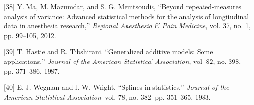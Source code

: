 \documentclass[
]{article}
\begin{document}
\leavevmode\hypertarget{ref-ma2012}{}%
{[}38{]} Y. Ma, M. Mazumdar, and S. G. Memtsoudis, ``Beyond
repeated-measures analysis of variance: Advanced statistical methods for
the analysis of longitudinal data in anesthesia research,''
\emph{Regional Anesthesia \& Pain Medicine}, vol. 37, no. 1, pp.
99--105, 2012.

\leavevmode\hypertarget{ref-hastie1987}{}%
{[}39{]} T. Hastie and R. Tibshirani, ``Generalized additive models:
Some applications,'' \emph{Journal of the American Statistical
Association}, vol. 82, no. 398, pp. 371--386, 1987.

\leavevmode\hypertarget{ref-wegman1983}{}%
{[}40{]} E. J. Wegman and I. W. Wright, ``Splines in statistics,''
\emph{Journal of the American Statistical Association}, vol. 78, no.
382, pp. 351--365, 1983.
\end{document}
